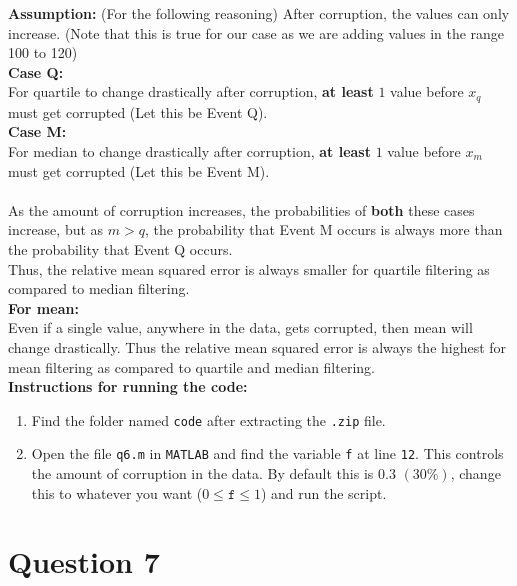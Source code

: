 \documentclass[11pt]{article}
\begin{document}
\medskip
\textbf{Assumption:} (For the following reasoning) After corruption, the values can only increase. (Note that this is true for our case as we are adding values in the range 100 to 120)\\
\textbf{Case Q:}\\
For quartile to change drastically after corruption, \textbf{at least} $1$ value before $x_q$ must get corrupted (Let this be Event Q).\\
\textbf{Case M:}\\
For median to change drastically after corruption, \textbf{at least} $1$ value before $x_m$ must get corrupted (Let this be Event M).\\
\\
As the amount of corruption increases, the probabilities of \textbf{both} these cases increase, but as $m > q$, the probability that Event M occurs is always more than the probability that Event Q occurs.\\
Thus, the relative mean squared error is always smaller for quartile filtering as compared to median filtering.\\

\medskip
\textbf{For mean:}\\
Even if a single value, anywhere in the data, gets corrupted, then mean will change drastically. Thus the relative mean squared error is always the highest for mean filtering as compared to quartile and median filtering.
\\

\textbf{Instructions for running the code:}
\begin{enumerate}[noitemsep]
    \item Find the folder named \texttt{code} after extracting the \texttt{.zip} file.
    \item Open the file \texttt{q6.m} in \texttt{MATLAB} and find the variable \texttt{f} at line \texttt{12}. This controls the amount of corruption in the data. By default this is $0.3$ $(30\%)$, change this to whatever you want ($0 \le \texttt{f} \le 1$) and run the script. 
\end{enumerate}



\newpage
\section*{Question 7}
\setcounter{equation}{0}
\end{document}
